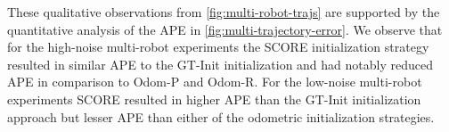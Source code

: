 These qualitative observations from \cref{fig:multi-robot-trajs} are supported
by the quantitative analysis of the APE in \cref{fig:multi-trajectory-error}. We
observe that for the high-noise multi-robot experiments the SCORE initialization
strategy resulted in similar APE to the GT-Init initialization and had notably
reduced APE in comparison to Odom-P and Odom-R. For the low-noise multi-robot
experiments SCORE resulted in higher APE than the GT-Init initialization
approach but lesser APE than either of the odometric initialization strategies.

